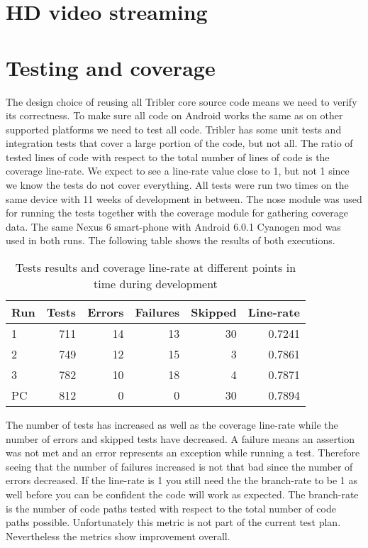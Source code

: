 \section{HD video streaming}


\section{Testing and coverage}
The design choice of reusing all Tribler core source code means we need to verify its correctness.
To make sure all code on Android works the same as on other supported platforms we need to test all code.
Tribler has some unit tests and integration tests that cover a large portion of the code, but not all.
The ratio of tested lines of code with respect to the total number of lines of code is the coverage line-rate.
We expect to see a line-rate value close to 1, but not 1 since we know the tests do not cover everything.
All tests were run two times on the same device with 11 weeks of development in between.
The nose module was used for running the tests together with the coverage module for gathering coverage data.
The same Nexus 6 smart-phone with Android 6.0.1 Cyanogen mod was used in both runs.
The following table shows the results of both executions.
\begin{table}
	\begin{tabular}{l | *{5}{r}} \hline
		Run & Tests & Errors & Failures & Skipped & Line-rate \\ \hline \hline
		1     & 711   & 14       & 13          & 30          & 0.7241 \\ \hline
		2     & 749   & 12       & 15          & 3            & 0.7861 \\ \hline
		3	  & 782	  & 10		 & 18		   & 4			  & 0.7871 \\ \hline
		PC  & 812   & 0         & 0            & 30         & 0.7894 \\ \hline
	\end{tabular}
	\caption{Tests results and coverage line-rate at different points in time during development}
	\label{table:testing_coverage}
\end{table}
The number of tests has increased as well as the coverage line-rate while the number of errors and skipped tests have decreased.
A failure means an assertion was not met and an error represents an exception while running a test.
Therefore seeing that the number of failures increased is not that bad since the number of errors decreased.
If the line-rate is 1 you still need the the branch-rate to be 1 as well before you can be confident the code will work as expected.
The branch-rate is the number of code paths tested with respect to the total number of code paths possible.
Unfortunately this metric is not part of the current test plan.
Nevertheless the metrics show improvement overall.

